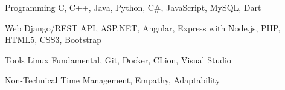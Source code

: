 
\begin{cvskills}
  \cvskill
    {Programming} %
    { C, C++,  Java, Python, C\#, JavaScript, MySQL, Dart} %

  \cvskill
    {Web} %
    {Django/REST API, ASP.NET, Angular, Express with Node.js, PHP, HTML5, CSS3, Bootstrap} %
   
   \cvskill
    {Tools} %
    {Linux Fundamental, Git, Docker, CLion, Visual Studio} %
    
    \cvskill
    {Non-Technical} %
    {Time Management, Empathy, Adaptability} %
    
\end{cvskills}